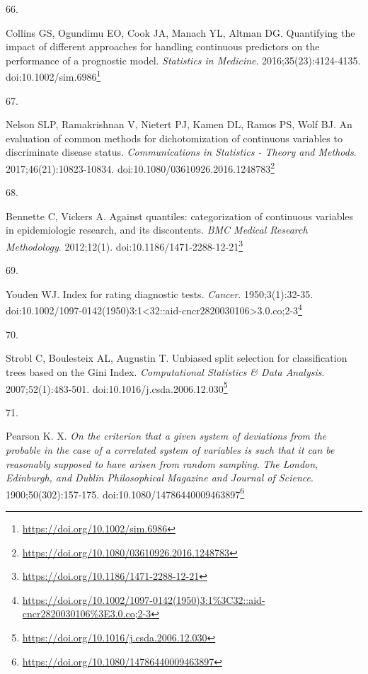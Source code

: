 \documentclass[
  a4paper,
]{book}
\newlength{\cslhangindent}
\newlength{\csllabelwidth}
\newlength{\cslentryspacingunit} %
\newenvironment{CSLReferences}[2] %
 {%
  \setlength{\parindent}{0pt}
  \ifodd #1
  \let\oldpar\par
  \def\par{\hangindent=\cslhangindent\oldpar}
  \fi
  \setlength{\parskip}{#2\cslentryspacingunit}
 }%
 {}
\newcommand{\CSLLeftMargin}[1]{\parbox[t]{\csllabelwidth}{#1}}
\newcommand{\CSLRightInline}[1]{\parbox[t]{\linewidth - \csllabelwidth}{#1}\break}
\renewcommand{\href}[2]{#2\footnote{\url{#1}}}
\begin{document}
\begin{CSLReferences}{0}{0}
\leavevmode{}%
\CSLLeftMargin{66. }%
\CSLRightInline{Collins GS, Ogundimu EO, Cook JA, Manach YL, Altman DG. Quantifying the impact of different approaches for handling continuous predictors on the performance of a prognostic model. \emph{Statistics in Medicine}. 2016;35(23):4124-4135. doi:\href{https://doi.org/10.1002/sim.6986}{10.1002/sim.6986}}

\leavevmode{}%
\CSLLeftMargin{67. }%
\CSLRightInline{Nelson SLP, Ramakrishnan V, Nietert PJ, Kamen DL, Ramos PS, Wolf BJ. An evaluation of common methods for dichotomization of continuous variables to discriminate disease status. \emph{Communications in Statistics - Theory and Methods}. 2017;46(21):10823-10834. doi:\href{https://doi.org/10.1080/03610926.2016.1248783}{10.1080/03610926.2016.1248783}}

\leavevmode{}%
\CSLLeftMargin{68. }%
\CSLRightInline{Bennette C, Vickers A. Against quantiles: categorization of continuous variables in epidemiologic research, and its discontents. \emph{BMC Medical Research Methodology}. 2012;12(1). doi:\href{https://doi.org/10.1186/1471-2288-12-21}{10.1186/1471-2288-12-21}}

\leavevmode{}%
\CSLLeftMargin{69. }%
\CSLRightInline{Youden WJ. Index for rating diagnostic tests. \emph{Cancer}. 1950;3(1):32-35. doi:\href{https://doi.org/10.1002/1097-0142(1950)3:1\%3C32::aid-cncr2820030106\%3E3.0.co;2-3}{10.1002/1097-0142(1950)3:1\textless32::aid-cncr2820030106\textgreater3.0.co;2-3}}

\leavevmode{}%
\CSLLeftMargin{70. }%
\CSLRightInline{Strobl C, Boulesteix AL, Augustin T. Unbiased split selection for classification trees based on the Gini Index. \emph{Computational Statistics \& Data Analysis}. 2007;52(1):483-501. doi:\href{https://doi.org/10.1016/j.csda.2006.12.030}{10.1016/j.csda.2006.12.030}}

\leavevmode{}%
\CSLLeftMargin{71. }%
\CSLRightInline{Pearson K. X. {\emph{On the criterion that a given system of deviations from the probable in the case of a correlated system of variables is such that it can be reasonably supposed to have arisen from random sampling}}. \emph{The London, Edinburgh, and Dublin Philosophical Magazine and Journal of Science}. 1900;50(302):157-175. doi:\href{https://doi.org/10.1080/14786440009463897}{10.1080/14786440009463897}}


\end{CSLReferences}
\end{document}
